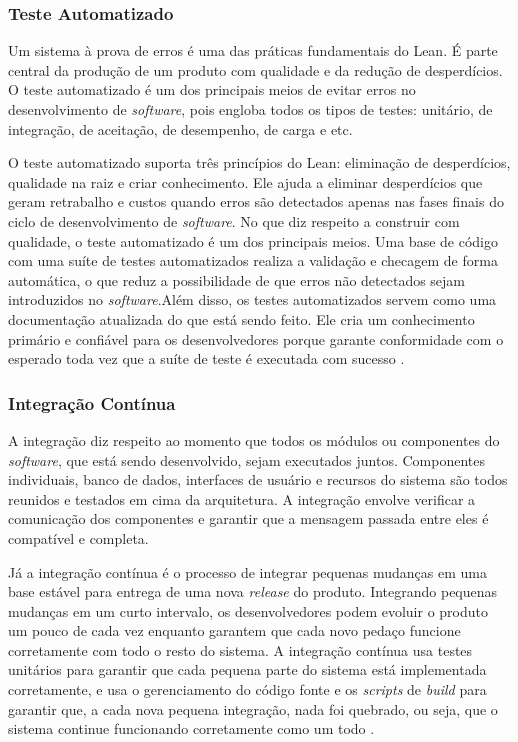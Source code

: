 \subsubsection[Teste Automatizado]{Teste Automatizado}

Um sistema à prova de erros é uma das práticas fundamentais do Lean. É parte central da produção de um produto com qualidade e da redução de desperdícios. O teste automatizado é um dos principais meios de evitar erros no desenvolvimento de \textit{software}, pois engloba todos os tipos de testes: unitário, de integração, de aceitação, de desempenho, de carga e etc.

O teste automatizado suporta três princípios do Lean: eliminação de desperdícios, qualidade na raiz e criar conhecimento. Ele ajuda a eliminar desperdícios que geram retrabalho e custos quando erros são detectados apenas nas fases finais do ciclo de desenvolvimento de \textit{software}. No que diz respeito a construir com qualidade, o teste automatizado é um dos principais meios. Uma base de código com uma suíte de testes automatizados realiza a validação e checagem de forma automática, o que reduz a possibilidade de que erros não detectados sejam introduzidos no \textit{software}.Além disso, os testes automatizados servem como uma documentação atualizada do que está sendo feito. Ele cria um conhecimento primário e confiável para os desenvolvedores porque garante conformidade com o esperado toda vez que a suíte de teste é executada com sucesso \cite{hibbs2009}.

\subsubsection[Integração Contínua]{Integração Contínua}

A integração diz respeito ao momento que todos os módulos ou componentes do \textit{software}, que está sendo desenvolvido, sejam executados juntos. Componentes individuais, banco de dados, interfaces de usuário e recursos do sistema são todos reunidos e testados em cima da arquitetura. A integração envolve verificar a comunicação dos componentes e garantir que a mensagem passada entre eles é compatível e completa. 

Já a integração contínua é o processo de integrar pequenas mudanças em uma base estável para entrega de uma nova \textit{release} do produto. Integrando pequenas mudanças em um curto intervalo, os desenvolvedores podem evoluir o produto um pouco de cada vez enquanto garantem que cada novo pedaço funcione corretamente com todo o resto do sistema. A integração contínua usa testes unitários para garantir que cada pequena parte do sistema está implementada corretamente, e usa o gerenciamento do código fonte e os \textit{scripts} de \textit{build} para garantir que, a cada nova pequena integração, nada foi quebrado, ou seja, que o sistema continue funcionando corretamente como um todo \cite{hibbs2009}. 

